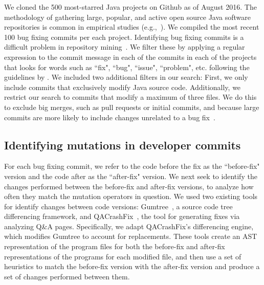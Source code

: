 \documentclass[conference]{IEEEtran}
\begin{document}
We cloned the 500 most-starred Java projects on Github 
as of August 2016. The methodology of 
gathering large,
popular, and active open source Java software repositories is common in
empirical studies (e.g.,~\cite{Ray14}). 
%
We compiled the most recent 100 bug fixing commits per each project. Identifying
bug fixing commits is a difficult
problem in repository mining~\cite{Bird09}. We filter these by applying a
regular expression to the commit message in each of the commits in each of the
projects that looks for words such as ``fix", ``bug", ``issue", ``problem",
etc. following the guidelines by \cite{schroter06,Cubranic05,Fischer03}. 
%
We included two additional filters in our search: First, we only include commits
that exclusively 
modify Java source code.  Additionally, we restrict our search to commits 
that modify a maximum of three files. We do this to exclude
big merges, such as pull requests or initial commits, and because
large commits are more likely to include changes unrelated to a bug fix~\cite{Dias15,Herzig13,Matsuda15,Kawrykow11}.

\subsection{Identifying mutations in developer commits}
\label{sec:mining}

For each bug fixing commit, we refer to the code before the fix as the
``before-fix" version and the code after as the ``after-fix" version.
We next seek to identify the changes performed between the before-fix and
after-fix versions, to analyze how often they match the mutation operators in
question. 
%
We used two existing tools for identify changes 
between code versions: Gumtree~\cite{falleri14}, a source code tree
differencing framework, and QACrashFix~\cite{gao15}, the tool for generating
fixes via analyzing Q\&A pages.  Specifically, we adapt QACrashFix's
differencing engine, which modifies Gumtree to account for replacements.
These tools create an AST representation of the program files for both the 
before-fix and after-fix representations of the programs for each modified file,
and then use a set of heuristics to match the before-fix version 
with the after-fix version and produce a set of 
changes performed between them. 
\end{document}

